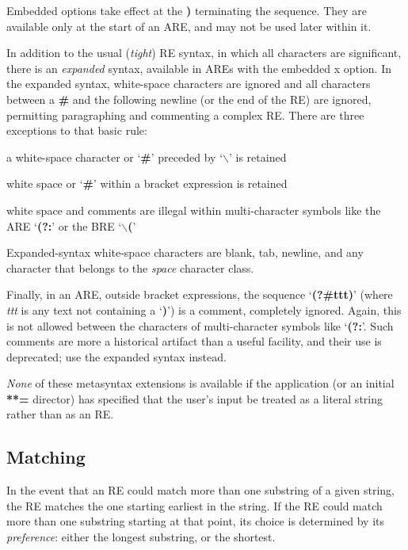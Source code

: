 Embedded options take effect at the {\bf )} terminating the
sequence. They are available only at the start of an ARE, and may not be
used later within it. 

In addition to the usual ({\it tight}) RE syntax, in which
all characters are significant, there is an {\it expanded} syntax, available
in AREs with the embedded
x option. In the expanded syntax, white-space characters are ignored and
all characters between a {\bf \#} and the following newline (or the end of the
RE) are ignored, permitting paragraphing and commenting a complex RE. There
are three exceptions to that basic rule:
{\itemize
\item%
a white-space character or `{\bf \#}' preceded
by `{\bf $\backslash$}' is retained 
\item%
white space or `{\bf \#}' within a bracket expression is retained
\item%
white space and comments are illegal within multi-character symbols like
the ARE `{\bf (?:}' or the BRE `{\bf $\backslash$(}' 
}
Expanded-syntax white-space characters are blank,
tab, newline, and any character that belongs to the {\it space} character class.

Finally, in an ARE, outside bracket expressions, the sequence `{\bf (?\#ttt)}' (where
 {\it ttt} is any text not containing a `{\bf )}') is a comment, completely ignored. Again,
this is not allowed between the characters of multi-character symbols like
`{\bf (?:}'. Such comments are more a historical artifact than a useful facility,
and their use is deprecated; use the expanded syntax instead. 

{\it None} of these
metasyntax extensions is available if the application (or an initial {\bf ***=}
director) has specified that the user's input be treated as a literal string
rather than as an RE. 

\subsection{Matching}\label{wxresynmatching}


In the event that an RE could match more than
one substring of a given string, the RE matches the one starting earliest
in the string. If the RE could match more than one substring starting at
that point, its choice is determined by its {\it preference}: either the longest
substring, or the shortest. 

